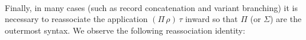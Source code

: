 \documentclass[authoryear, acmsmall, screen, review, nonacm]{acmart}
\begin{document}
\begin{code}%
%
\>[2]\AgdaSpace{}%
\AgdaSymbol{:}\AgdaSpace{}%
\AgdaSpace{}%
\AgdaSymbol{\{}\AgdaSymbol{\}}\AgdaSpace{}%
\AgdaSymbol{\{}\AgdaSpace{}%
\AgdaSymbol{:}\AgdaSpace{}%
\AgdaSpace{}%
\AgdaSymbol{(}\AgdaSpace{}%
\AgdaOperator{\AgdaInductiveConstructor{,,}}\AgdaSpace{}%
\AgdaSymbol{)}\AgdaSpace{}%
\AgdaSymbol{\}}\AgdaSpace{}%
\<%
\\
\>[2][@{}l@{\AgdaIndent{0}}]%
\>[4]\AgdaSpace{}%
\AgdaSpace{}%
\AgdaSymbol{(}\AgdaSpace{}%
\AgdaSpace{}%
\AgdaSpace{}%
\AgdaSymbol{)}\AgdaSpace{}%
\AgdaSpace{}%
\AgdaSpace{}%
\AgdaSymbol{(}\AgdaSpace{}%
\AgdaSpace{}%
\AgdaSymbol{(}\AgdaSpace{}%
\AgdaSpace{}%
\AgdaSpace{}%
\AgdaSymbol{))}\<%
\end{code}

Finally, in many cases (such as record concatenation and variant branching) it is necessary to reassociate the application $(\Pi\, \rho)\, \tau$ inward so that $\Pi$ (or $\Sigma$) are the outermost syntax. We observe the following reassociation identity:

\begin{code}%
%
\>[2]\AgdaSpace{}%
\AgdaSymbol{:}\AgdaSpace{}%
\AgdaSpace{}%
\AgdaSymbol{\{}\AgdaSpace{}%
\AgdaSymbol{:}\AgdaSpace{}%
\AgdaSpace{}%
\AgdaSpace{}%
\AgdaSymbol{(}\AgdaOperator{\AgdaInductiveConstructor{R[}}\AgdaSpace{}%
\AgdaSpace{}%
\AgdaSpace{}%
\AgdaSpace{}%
\AgdaOperator{\AgdaInductiveConstructor{]}}\AgdaSymbol{)\}}\AgdaSpace{}%
\AgdaSymbol{\{}\AgdaSpace{}%
\AgdaSymbol{:}\AgdaSpace{}%
\AgdaSpace{}%
\AgdaSpace{}%
\AgdaSymbol{\}}\AgdaSpace{}%
\<%
\\
\>[2][@{}l@{\AgdaIndent{0}}]%
\>[4]\AgdaSymbol{(}\AgdaSpace{}%
\AgdaSpace{}%
\AgdaSymbol{)}\AgdaSpace{}%
\AgdaSpace{}%
\AgdaSpace{}%
\AgdaSpace{}%
\AgdaSpace{}%
\AgdaSpace{}%
\AgdaSymbol{(}\AgdaSpace{}%
\AgdaSpace{}%
\AgdaSymbol{)}\<%
\end{code}
\end{document}
